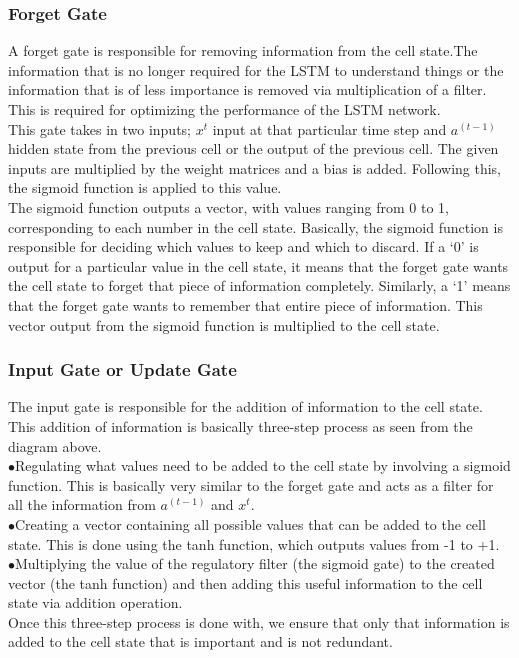   \subsubsection{Forget Gate}
  A forget gate is responsible for removing information from the cell state.The information that is no longer required for the LSTM to understand things or the information that is of less importance is removed via multiplication of a filter. This is required for optimizing the performance of the LSTM network.\\
  This gate takes in two inputs; $x^t$ input at that particular time step and $a^{(t-1)}$ hidden state from the previous cell or the output of the previous cell. The given inputs are multiplied by the weight matrices and a bias is added. Following this, the sigmoid function is applied to this value.\\
  The sigmoid function outputs a vector, with values ranging from 0 to 1, corresponding to each number in the cell state. Basically, the sigmoid function is responsible for deciding which values to keep and which to discard. If a ‘0’ is output for a particular value in the cell state, it means that the forget gate wants the cell state to forget that piece of information completely. Similarly, a ‘1’ means that the forget gate wants to remember that entire piece of information. This vector output from the sigmoid function is multiplied to the cell state.
  \subsubsection{Input Gate or Update Gate}The input gate is responsible for the addition of information to the cell state. This addition of information is basically three-step process as seen from the diagram above.\\
  \indent$\bullet$Regulating what values need to be added to the cell state by involving a sigmoid function. This is basically very similar to the forget gate and acts as a filter for all the information from $a^{(t-1)}$ and $x^t$.\\
  \indent$\bullet$Creating a vector containing all possible values that can be added to the cell state. This is done using the tanh function, which outputs values from -1 to +1.\\
  \indent$\bullet$Multiplying the value of the regulatory filter (the sigmoid gate) to the created vector (the tanh function) and then adding this useful information to the cell state via addition operation.\\
  Once this three-step process is done with, we ensure that only that information is added to the cell state that is important and is not redundant.
